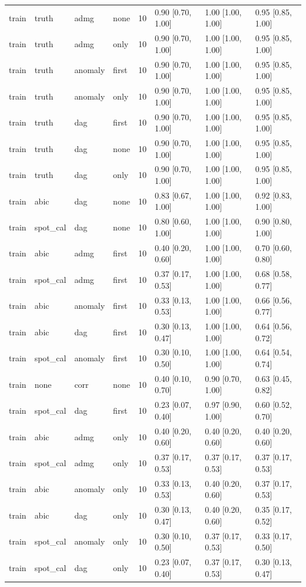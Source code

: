 \begin{table}[t]
\begin{tabular}{@{}llllllll@{}}
train & truth & admg & none & 10 & 0.90 [0.70, 1.00] & 1.00 [1.00, 1.00] & 0.95 [0.85, 1.00]\\
train & truth & admg & only & 10 & 0.90 [0.70, 1.00] & 1.00 [1.00, 1.00] & 0.95 [0.85, 1.00]\\
train & truth & anomaly & first & 10 & 0.90 [0.70, 1.00] & 1.00 [1.00, 1.00] & 0.95 [0.85, 1.00]\\
train & truth & anomaly & only & 10 & 0.90 [0.70, 1.00] & 1.00 [1.00, 1.00] & 0.95 [0.85, 1.00]\\
train & truth & dag & first & 10 & 0.90 [0.70, 1.00] & 1.00 [1.00, 1.00] & 0.95 [0.85, 1.00]\\
train & truth & dag & none & 10 & 0.90 [0.70, 1.00] & 1.00 [1.00, 1.00] & 0.95 [0.85, 1.00]\\
train & truth & dag & only & 10 & 0.90 [0.70, 1.00] & 1.00 [1.00, 1.00] & 0.95 [0.85, 1.00]\\
train & abic & dag & none & 10 & 0.83 [0.67, 1.00] & 1.00 [1.00, 1.00] & 0.92 [0.83, 1.00]\\
train & spot\_cal & dag & none & 10 & 0.80 [0.60, 1.00] & 1.00 [1.00, 1.00] & 0.90 [0.80, 1.00]\\
train & abic & admg & first & 10 & 0.40 [0.20, 0.60] & 1.00 [1.00, 1.00] & 0.70 [0.60, 0.80]\\
train & spot\_cal & admg & first & 10 & 0.37 [0.17, 0.53] & 1.00 [1.00, 1.00] & 0.68 [0.58, 0.77]\\
train & abic & anomaly & first & 10 & 0.33 [0.13, 0.53] & 1.00 [1.00, 1.00] & 0.66 [0.56, 0.77]\\
train & abic & dag & first & 10 & 0.30 [0.13, 0.47] & 1.00 [1.00, 1.00] & 0.64 [0.56, 0.72]\\
train & spot\_cal & anomaly & first & 10 & 0.30 [0.10, 0.50] & 1.00 [1.00, 1.00] & 0.64 [0.54, 0.74]\\
train & none & corr & none & 10 & 0.40 [0.10, 0.70] & 0.90 [0.70, 1.00] & 0.63 [0.45, 0.82]\\
train & spot\_cal & dag & first & 10 & 0.23 [0.07, 0.40] & 0.97 [0.90, 1.00] & 0.60 [0.52, 0.70]\\
train & abic & admg & only & 10 & 0.40 [0.20, 0.60] & 0.40 [0.20, 0.60] & 0.40 [0.20, 0.60]\\
train & spot\_cal & admg & only & 10 & 0.37 [0.17, 0.53] & 0.37 [0.17, 0.53] & 0.37 [0.17, 0.53]\\
train & abic & anomaly & only & 10 & 0.33 [0.13, 0.53] & 0.40 [0.20, 0.60] & 0.37 [0.17, 0.53]\\
train & abic & dag & only & 10 & 0.30 [0.13, 0.47] & 0.40 [0.20, 0.60] & 0.35 [0.17, 0.52]\\
train & spot\_cal & anomaly & only & 10 & 0.30 [0.10, 0.50] & 0.37 [0.17, 0.53] & 0.33 [0.17, 0.50]\\
train & spot\_cal & dag & only & 10 & 0.23 [0.07, 0.40] & 0.37 [0.17, 0.53] & 0.30 [0.13, 0.47]\\
\bottomrule
\end{tabular}
\end{table}
